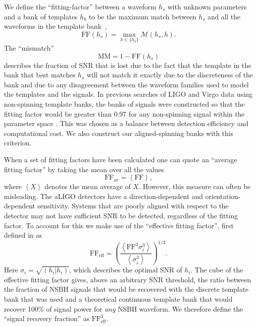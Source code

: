 We define the ``fitting-factor'' between a waveform $h_s$ with unknown
parameters
and a bank of templates $h_b$ to be the maximum match between $h_s$ and all the
waveforms in the template bank~\cite{Apostolatos:1995pj},
%
\begin{equation}
\mathrm{FF}(h_s) = \max_{h \in \{h_b\}} \mathcal{M}(h_s,h).
\end{equation}
%
The ``mismatch''
%
\begin{equation}
\mathrm{MM} = 1 - \mathrm{FF}(h_s)
\end{equation}
%
describes the fraction of \ac{SNR} that is lost due to the fact that the
template in the bank that best matches $h_s$ will not match it exactly due to
the discreteness of the bank and due to any disagreement between the waveform 
families used to model the templates and the signals. In previous searches of 
LIGO and Virgo data using
non-spinning template banks, the banks of signals were constructed so that the
fitting factor would be greater than 0.97 for any non-spinning signal within
the parameter space \cite{Babak:2012zx}. This was chosen as a balance between
detection efficiency and computational cost. We also construct our 
aligned-spinning banks with this criterion.

When a set of fitting factors have been calculated one can quote an ``average 
fitting factor'' by taking the mean over all the values
%
\begin{equation}
 \textrm{FF}_{\textrm{av}} =  \left\langle \textrm{FF}
\right\rangle,
\end{equation}
%
where $\left\langle X \right\rangle$ denotes the mean average of $X$.
However, this measure can often be misleading.
The \ac{aLIGO} detectors have a direction-dependent and
orientation-dependent sensitivity. Systems that are poorly aligned with respect
to the detector may not have sufficient \ac{SNR} to be detected, regardless of
the fitting factor.
To account for this we make use of the ``effective fitting factor'',
first defined in \cite{Buonanno:2002fy} as
%
\begin{equation}
 \textrm{FF}_{\textrm{eff}} = \left( 
 \frac{ \left\langle \textrm{FF}^3 \sigma_i^3 \right\rangle }{\left\langle
\sigma_i^3 \right\rangle} \right)^{1/3}.
\end{equation}
%
Here $\sigma_i = \sqrt{(h_i|h_i)}$, which describes the optimal \ac{SNR}
of $h_i$. The cube of the effective fitting factor gives, above an
arbitrary \ac{SNR} threshold, the ratio between the fraction of \ac{NSBH}
signals that would be recovered with the discrete template bank that was used
and a theoretical continuous template bank that would recover 100\% of signal
power for \emph{any} \ac{NSBH} waveform. We therefore define the ``signal
recovery fraction'' as $\textrm{FF}_{\textrm{eff}}^3$.

